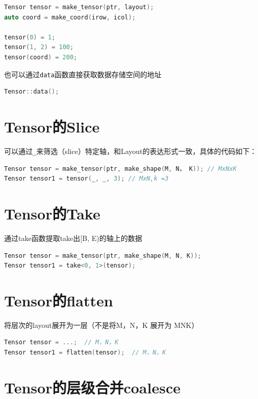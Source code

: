 \begin{lstlisting}[language=C++]
Tensor tensor = make_tensor(ptr, layout);
auto coord = make_coord(irow, icol);

tensor(0) = 1;
tensor(1, 2) = 100;
tensor(coord) = 200;
\end{lstlisting}

也可以通过\verb|data|函数直接获取数据存储空间的地址

\begin{lstlisting}[language=C++]
Tensor::data();
\end{lstlisting}

\section{Tensor的Slice}

可以通过\verb|_|来筛选（slice）特定轴，和Layout的表达形式一致，具体的代码如下：

\begin{lstlisting}[language=C++]
Tensor tensor = make_tensor(ptr, make_shape(M, N， K)); // MxNxK
Tensor tensor1 = tensor(_, _, 3); // MxN,k =3
\end{lstlisting}

\section{Tensor的Take}

通过take函数提取take出[B, E)的轴上的数据

\begin{lstlisting}[language=C++]
Tensor tensor = make_tensor(ptr, make_shape(M, N, K));
Tensor tensor1 = take<0, 1>(tensor);
\end{lstlisting}

\section{Tensor的flatten}

将层次的layout展开为一层（不是将M，N，K 展开为 MNK）

\begin{lstlisting}[language=C++]
Tensor tensor = ...;  // M，N，K
Tensor tensor1 = flatten(tensor);  // M，N，K
\end{lstlisting}

\section{Tensor的层级合并coalesce}

